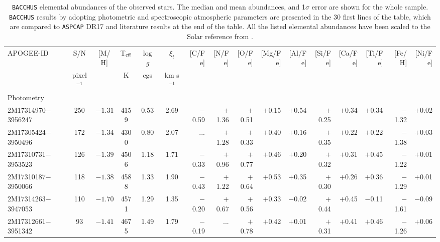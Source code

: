 \documentclass[longauth]{aa} %
\begin{document}
\begin{table*}
	\begin{small}
		\begin{center}
			\setlength{\tabcolsep}{1.mm}  
			\caption{\texttt{BACCHUS} elemental abundances of  the observed stars. The median and mean abundances, and 1$\sigma$ error are shown for the whole sample. \texttt{BACCHUS} results by adopting photometric and spectroscopic atmospheric parameters are presented in the 30 first lines of the table, which are compared to \texttt{ASPCAP} DR17 and literature results at the end of the table. All the listed elemental abundances have been scaled to the Solar reference from \citet{Asplund2005}.}
			\begin{tabular}{lcccccrrrrrrrrrr}
				\hline
				\hline
				APOGEE-ID & S/N &     [M/H] & T$_{\rm eff}$ & $\log$ \textit{g}  &   $\xi_{t}$   & [C/Fe] & [N/Fe] & [O/Fe] & [Mg/Fe]  & [Al/Fe] & [Si/Fe] & [Ca/Fe] & [Ti/Fe]  & [Fe/H]  & [Ni/Fe] \\
				& pixel$^{-1}$ &     & K & cgs &   km s$^{-1}$   &  &  &  &   & &  & & &   &  \\
				\hline
				\hline
			    { Photometry	}		&  &     &  &  &    &  &  &  &   & &  & & &   &  \\
\hline		
\hline			
2M17314970$-$3956247 & 250 & $-1.31$ & 4159  & 0.53 &  2.69  &  $-$0.59  &  $+$1.36 &   $+$0.51 & $+$0.15 & $+$0.54 &  $+$0.25 &  $+$0.34 &    $+$0.34 & $-$1.32 &    $+$0.02 \\
2M17305424$-$3950496 &  172 & $-1.34$ & 4300  & 0.80 &  2.07  &  ...              &  $+$1.28 &  $+$0.33 & $+$0.40 & $+$0.16 &  $+$0.35 &  $+$0.22 &    $+$0.22 & $-$1.38 &    $+$0.03 \\
2M17310731$-$3953523 &  126 & $-1.39$ & 4506  & 1.18 &  1.71  &  $-$0.33  &  $+$0.96 &  $+$0.77 & $+$0.46 & $+$0.20 &  $+$0.32 &  $+$0.31 &    $+$0.45 & $-$1.22 &    $+$0.01 \\
2M17310187$-$3950066 &  118 & $-1.38$ & 4588  & 1.33 &  1.90  &  $-$0.43  &  $+$1.22 &  $+$0.64 & $+$0.53 & $+$0.35 &  $+$0.30 &  $+$0.26 &    $+$0.36 & $-$1.29 &    $+$0.01 \\
2M17314263$-$3947053 &  110 & $-1.70$ & 4571  & 1.29 &  1.35  &  $-$0.20  &  $+$0.67 &  $+$0.56 & $+$0.33 & $-$0.02 &   $+$0.44 &  $+$0.45 &    $-$0.11 & $-$1.61 & $-$0.09 \\
2M17312661$-$3951342 &    93 &  $-1.41$ & 4675  & 1.49 &  1.79  &  $-$0.19  &  ...              &  $+$0.78 & $+$0.42 & $+$0.01 &  $+$0.31 &  $+$0.41 &    $+$0.46 & $-$1.26 &    $+$0.06 \\

\end{tabular}
\end{center}
\end{small}
\end{table*}
\end{document}
